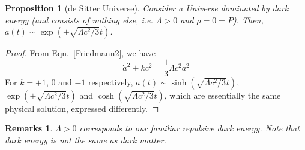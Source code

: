 \documentclass[a4paper]{article}
\newtheorem{remarks}{Remarks}[section]
\theoremstyle{new}
\newtheorem{prop}{Proposition}[section]
\begin{document}
\begin{prop}[de Sitter Universe]
Consider a Universe dominated by dark energy (and consists of nothing else, i.e. $\Lambda>0$ and $\rho=0=P$). Then, $a(t)\sim\exp(\pm\sqrt{\Lambda c^2/3}t)$.
\end{prop}
\begin{proof}
From Eqn.~\ref{Friedmann2}, we have
$$\dot{a}^2+kc^2=\frac{1}{3}\Lambda c^2a^2$$
For $k=+1$, $0$ and $-1$ respectively, $a(t)\sim\sinh(\sqrt{\Lambda c^2/3}t)$, $\exp(\pm\sqrt{\Lambda c^2/3}t)$ and $\cosh(\sqrt{\Lambda c^2/3}t)$, which are essentially the same physical solution, expressed differently.
\end{proof}
\begin{remarks}
$\Lambda>0$ corresponds to our familiar repulsive dark energy. Note that dark energy is not the same as dark matter.
\end{remarks}
\end{document}
